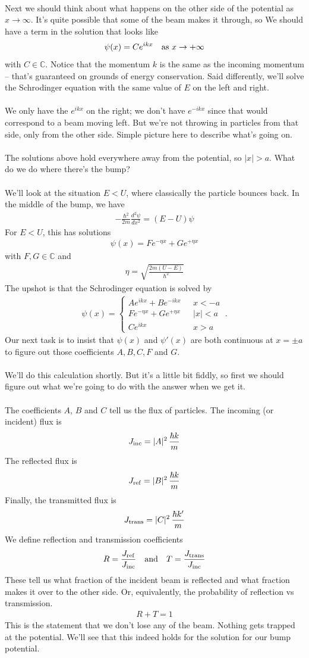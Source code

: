 \documentclass[12pt]{article}
\def\be{\begin{eqnarray}}
\def\ee{\end{eqnarray}}
\newcommand{\nn}{\nonumber}
\newcommand\para{\paragraph{}}
\newcommand{\ra}{\rightarrow}
\newcommand{\co}{\color{olive}}
\newcommand{\cblue}{\color{blue}}
\newcommand{\C}{{\mathds C}}
\begin{document}
\para
Next we should think about what happens on the other side of the potential as $x\ra \infty$. It's quite possible that some of the beam makes it through, so {\co We should have a term in the solution that looks like
%
\be \psi(x) = C e^{ikx} \ \ \ {\rm as}\ x\ra +\infty\nn\ee
%
with $C\in \C$.} Notice that the momentum $k$ is the same as the incoming momentum -- that's guaranteed on grounds of energy conservation. Said differently, we'll solve the Schrodinger equation with the same value of $E$ on the left and right. 

\para
We only have the $e^{ikx}$ on the right; we don't have $e^{-ikx}$ since that would correspond to a beam moving left. But we're not throwing in particles from that side, only from the other side. {\cblue Simple picture here to describe what's going on.}

\para
The solutions above hold everywhere away from the potential, so $|x|>a$. What do we do where there's the bump?

\para
{\co We'll look at the situation $E<U$, where classically the particle bounces back. In the middle of the bump, we have
%
\be -\frac{\hbar^2}{2m} \frac{d^2\psi}{dx^2} = (E-U)\psi\nn\ee
%
For $E<U$, this has solutions 
%
\be \psi(x) = F e^{-\eta x} + G e^{+\eta x}\nn\ee
%
with $F,G\in \C$ and 
%
\be \eta = \sqrt{\frac{2m(U-E)}{\hbar^2}}\nn\ee
%
The upshot is that the Schrodinger equation is solved by 
%
\be \psi(x) =\left\{\begin{array}{cc}Ae^{ikx} + Be^{-ikx} & \ \ \ x<-a\\ Fe^{-\eta x} + Ge^{+\eta x} & \ \ \ |x| <a \\ 
Ce^{ikx} & \ \ \ x>a\end{array}\right.\ .\ee
%
Our next task is to insist that $\psi(x)$ and $\psi'(x)$ are both continuous at $x=\pm a$ to figure out those coefficients $A,B,C,F$ and $G$.}

\para
We'll do this calculation shortly. But it's a little bit fiddly, so first we should figure out what we're going to do with the answer when we get it. 

\para
{\co The coefficients $A$, $B$ and $C$ tell us the flux of particles. The incoming (or incident) flux is
%
\be J_{\rm inc} = |A|^2 \,\frac{\hbar k}{m}\nn\ee
%
The reflected flux is
%
\be J_{\rm ref} =  |B|^2\,\frac{\hbar k}{m}\nn\ee
%
Finally, the transmitted flux is
%
%
\be J_{\rm trans} = |C|^2\,\frac{\hbar k'}{m}\nn\ee
%
We define reflection and transmission coefficients
%
\be R = \frac{J_{\rm ref}}{J_{\rm inc}} \ \ \ {\rm and}\ \ \  T = \frac{J_{\rm trans}}{J_{\rm inc}}\nn\ee
%
These tell us what fraction of the incident beam is reflected and what fraction makes it over to the other side. Or, equivalently, the probability of reflection vs transmission. 
%
\be R +T =1\nn\ee
%
This is the statement that we don't lose any of the beam. } Nothing gets trapped at the potential. We'll see that this indeed holds for the solution for our bump potential.
\end{document}
